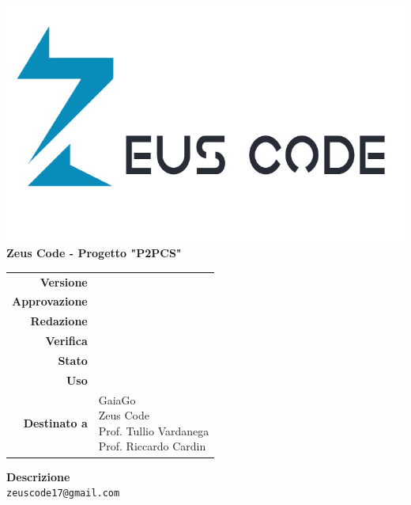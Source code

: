 \thispagestyle{empty}
\begin{titlepage}
	\begin{center}
		\includegraphics[scale = 0.3]{res/images/zeus_code_logo.png}\\
		\large \textbf{Zeus Code - Progetto "P2PCS"} \\
		\vfill
		\Huge \textbf{\doctitle}
		\vspace*{\fill}
		
		\vfill
		\large
		\begin{tabular}{r|l}
			 \textbf{Versione} & \rev{} \\
			\textbf{Approvazione} & \approv{} \\
			\textbf{Redazione} & \red{} \\
			\textbf{Verifica} & \ver{} \\
			\textbf{Stato} & \stato{} \\
			\textbf{Uso} & \uso{} \\
			\textbf{Destinato a} & \parbox[t]{5cm}{GaiaGo \\Zeus Code
			\\Prof. Tullio Vardanega\\Prof. Riccardo Cardin}
		\end{tabular}
		\vfill
		\normalsize
		\textbf{Descrizione}\\
		\describedoc
		\vfill
		\small
		\texttt{zeuscode17@gmail.com}
	\end{center}
\end{titlepage}